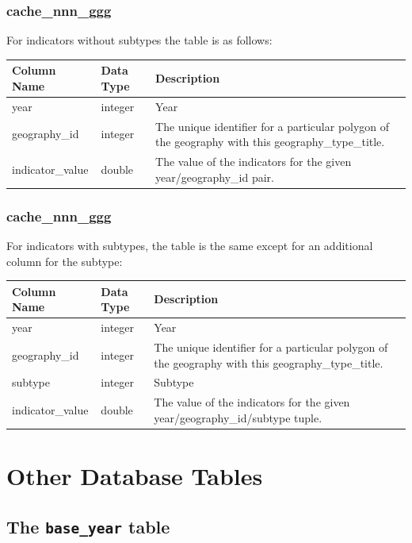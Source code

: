 \subsubsection{cache_nnn_ggg}

For indicators without subtypes the table is as follows:

\begin{tabular}{|l|l|p{3.9in}|}
\hline
\textbf{Column Name} & \textbf{Data Type} & \textbf{Description} \\
\hline
year & integer & Year  \\
\hline
geography_id & integer & The unique identifier for a particular polygon of the geography with this geography_type_title.  \\
\hline
indicator_value & double & The value of the indicators for the given year/geography_id pair.  \\
\hline

\end{tabular}

\subsubsection{cache_nnn_ggg}

For indicators with subtypes, the table is the same except for an additional
column for the subtype:

\begin{tabular}{|l|l|p{3.9in}|}
\hline
\textbf{Column Name} & \textbf{Data Type} & \textbf{Description} \\
\hline
year & integer & Year  \\
\hline
geography_id & integer & The unique identifier for a particular polygon of the geography with this geography_type_title.  \\
\hline
subtype & integer & Subtype  \\
\hline
indicator_value & double & The value of the indicators for the given year/geography_id/subtype tuple.  \\
\hline

\end{tabular}

\section{Other Database Tables}
\label{sec:other-db-tables}


\subsection{The {\tt base_year} table}


